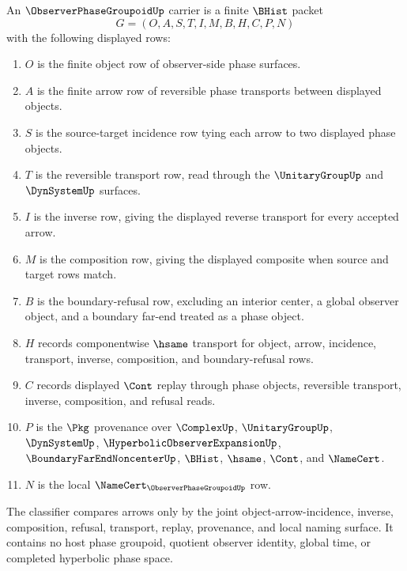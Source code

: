 \begin{definition}
\label{def:observer-phase-groupoid-carrier}
An $\ObserverPhaseGroupoidUp$ carrier is a finite $\BHist$ packet
$$
G=(O,A,S,T,I,M,B,H,C,P,N)
$$
with the following displayed rows:
\begin{enumerate}
\item $O$ is the finite object row of observer-side phase surfaces.
\item $A$ is the finite arrow row of reversible phase transports between displayed objects.
\item $S$ is the source-target incidence row tying each arrow to two displayed phase objects.
\item $T$ is the reversible transport row, read through the $\UnitaryGroupUp$ and $\DynSystemUp$ surfaces.
\item $I$ is the inverse row, giving the displayed reverse transport for every accepted arrow.
\item $M$ is the composition row, giving the displayed composite when source and target rows match.
\item $B$ is the boundary-refusal row, excluding an interior center, a global observer object, and a boundary far-end treated as a phase object.
\item $H$ records componentwise $\hsame$ transport for object, arrow, incidence, transport, inverse, composition, and boundary-refusal rows.
\item $C$ records displayed $\Cont$ replay through phase objects, reversible transport, inverse, composition, and refusal reads.
\item $P$ is the $\Pkg$ provenance over $\ComplexUp$, $\UnitaryGroupUp$, $\DynSystemUp$, $\HyperbolicObserverExpansionUp$, $\BoundaryFarEndNoncenterUp$, $\BHist$, $\hsame$, $\Cont$, and $\NameCert$.
\item $N$ is the local $\NameCert_{\ObserverPhaseGroupoidUp}$ row.
\end{enumerate}
The classifier compares arrows only by the joint object-arrow-incidence, inverse, composition, refusal, transport, replay, provenance, and local naming surface. It contains no host phase groupoid, quotient observer identity, global time, or completed hyperbolic phase space.
\end{definition}

